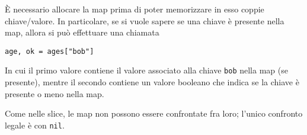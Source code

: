 \documentclass[../../thesis.tex]{subfiles}
\begin{document}
    È necessario allocare la map prima di poter memorizzare in esso coppie chiave/valore.
    In particolare, se si vuole sapere se una chiave è presente nella map, allora si può effettuare una chiamata
    \begin{lstlisting}[frame = single,label={lst:lstlisting3-3.12}]
age, ok = ages["bob"]
    \end{lstlisting}
    In cui il primo valore contiene il valore associato alla chiave \verb"bob" nella map (se presente), mentre il secondo contiene un valore booleano che indica se la chiave è presente o meno nella map.
    \hfill \vspace{12pt}

    Come nelle slice, le map non possono essere confrontate fra loro;
    l'unico confronto legale è con \verb"nil".
\end{document}

